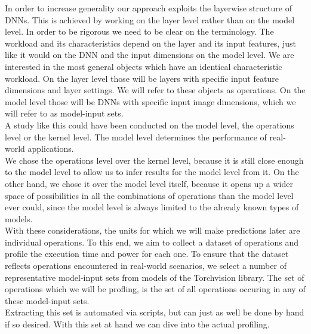 In order to increase generality our approach exploits the layerwise structure of DNNs. This is achieved by working on the layer level rather than on the model level. In order to be rigorous we need to be clear on the terminology. The workload and its characteristics depend on the layer and its input features, just like it would on the DNN and the input dimensions on the model level. We are interested in the most general objects which have an identical characteristic workload. On the layer level those will be layers with specific input feature dimensions and layer settings. We will refer to these objects as operations. On the model level those will be DNNs with specific input image dimensions, which we will refer to as model-input sets. \\
A study like this could have been conducted on the model level, the operations level or the kernel level. The model level determines the performance of real-world applications. \\
We chose the operations level over the kernel level, because it is still close enough to the model level to allow us to infer results for the model level from it. On the other hand, we chose it over the model level itself, because it opens up a wider space of possibilities in all the combinations of operations than the model level ever could, since the model level is always limited to the already known types of models. \\ 
With these considerations, the units for which we will make predictions later are individual operations. To this end, we aim to collect a dataset of operations and profile the execution time and power for each one. To ensure that the dataset reflects operations encountered in real-world scenarios, we select a number of representative model-input sets from models of the Torchvision library. The set of operations which we will be profling, is the set of all operations occuring in any of these model-input sets. \\
Extracting this set is automated via scripts, but can just as well be done by hand if so desired. With this set at hand we can dive into the actual profiling.



